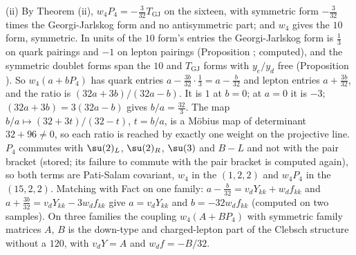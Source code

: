 (ii) By Theorem (ii), $w_{4}P_{4} = -\tfrac{3}{32}T_{\mathrm{GJ}}$ on the sixteen, with symmetric form $-\tfrac{3}{32}$ times the Georgi-Jarlskog form and no antisymmetric part; and $w_{4}$ gives the $10$ form, symmetric. In units of the $10$ form's entries the Georgi-Jarlskog form is $\tfrac13$ on quark pairings and $-1$ on lepton pairings (Proposition ; computed), and the symmetric doublet forms span the $10$ and $T_{\mathrm{GJ}}$ forms with $y_{e}/y_{d}$ free (Proposition ). So $w_{4}(a + bP_{4})$ has quark entries $a - \tfrac{3b}{32}\cdot\tfrac13 = a - \tfrac{b}{32}$ and lepton entries $a + \tfrac{3b}{32}$, and the ratio is $(32a + 3b)/(32a - b)$. It is $1$ at $b = 0$; at $a = 0$ it is $-3$; $(32a + 3b) = 3(32a - b)$ gives $b/a = \tfrac{32}{3}$. The map $b/a \mapsto (32 + 3t)/(32 - t)$, $t = b/a$, is a Möbius map of determinant $32 + 96 \ne 0$, so each ratio is reached by exactly one weight on the projective line. $P_{4}$ commutes with $\su(2)_{L}$, $\su(2)_{R}$, $\su(3)$ and $B - L$ and not with the pair bracket (stored; its failure to commute with the pair bracket is computed again), so both terms are Pati-Salam covariant, $w_{4}$ in the $(1,2,2)$ and $w_{4}P_{4}$ in the $(15,2,2)$. Matching with Fact  on one family: $a - \tfrac{b}{32} = v_{d}Y_{kk} + w_{d}f_{kk}$ and $a + \tfrac{3b}{32} = v_{d}Y_{kk} - 3w_{d}f_{kk}$ give $a = v_{d}Y_{kk}$ and $b = -32w_{d}f_{kk}$ (computed on two samples). On three families the coupling $w_{4}(A + BP_{4})$ with symmetric family matrices $A$, $B$ is the down-type and charged-lepton part of the Clebsch structure without a $120$, with $v_{d}Y = A$ and $w_{d}f = -B/32$.

